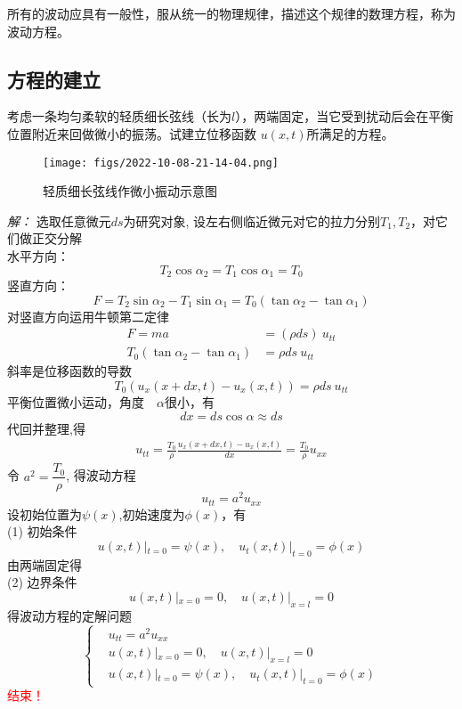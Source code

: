 所有的波动应具有一般性，服从统一的物理规律，描述这个规律的数理方程，称为波动方程。

\subsection{方程的建立}
\begin{example}
考虑一条均匀柔软的轻质细长弦线（长为$l$），两端固定，当它受到扰动后会在平衡位置附近来回做微小的振荡。试建立位移函数 $u(x,t)$所满足的方程。 
\end{example}
\begin{figure}[htbp]
	\centering
	\texttt{[image: figs/2022-10-08-21-14-04.png]}
	\caption{轻质细长弦线作微小振动示意图}
\end{figure}
\emph{解：}
选取任意微元$ds$为研究对象, 设左右侧临近微元对它的拉力分别$T_1, T_2$，对它们做正交分解\\
水平方向： $$T_2\cos \alpha _2 = T_1\cos \alpha _1 = T_0$$ 
竖直方向：$$F=T_2\sin \alpha _2-T_1\sin \alpha _1 = T_0(\tan \alpha _2-\tan \alpha _1) $$  
对竖直方向运用牛顿第二定律
$$\begin{aligned}
	F =ma &=(\rho ds)~ u_{tt} \\
	T_0 (\tan \alpha _2 -\tan \alpha _1 ) &= \rho ds~ u_{tt} 
\end{aligned}$$
斜率是位移函数的导数
$$ T_0(u_x(x+dx,t)-u_x(x,t)) =\rho ds~ u_{tt}$$
平衡位置微小运动，角度　$ \alpha  $很小，有 
$$ dx = ds \cos \alpha \approx ds $$
代回并整理,得
$$\begin{aligned}
	u_{tt} = \frac{T_0}{\rho} \frac{u_x(x+dx,t)-u_x(x,t)}{dx} =\frac{T_0}{\rho} u_{xx}  
\end{aligned}$$
令 $a^2 =\dfrac{T_0}{\rho}$,
得波动方程
\begin{equation} 
	\boxed{u_{tt} = a^2 u_{xx}}  
\end{equation} 
设初始位置为$\psi (x)$,初始速度为$\phi (x)$，有 \\ 
(1) 初始条件 
	$$ u(x,t)|_{t=0}= \psi (x),\quad  u_t(x,t)|_{t=0}= \phi (x) $$
由两端固定得 \\
(2) 边界条件
	$$ u(x,t)|_{x=0}= 0 ,\quad  u(x,t)|_{x=l}= 0 $$
得波动方程的定解问题
$$\left\{
\begin{aligned}
	&u_{tt} = a^2 u_{xx} \\
	&u(x,t)|_{x=0}= 0 ,\quad  u(x,t)|_{x=l}= 0\\
	&u(x,t)|_{t=0}= \psi (x),\quad  u_t(x,t)|_{t=0}= \phi (x)
\end{aligned}\right.
$$
\textcolor{red}{结束！}


